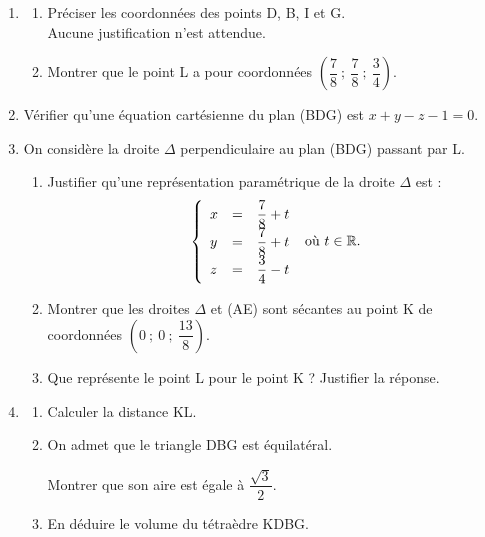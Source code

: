 \documentclass[10pt]{article}
\providecommand{\R}{\mathbb{R}}
\begin{document}
\begin{enumerate}
\item
	\begin{enumerate}
		\item Préciser les coordonnées des points D, B, I et G. \\
		Aucune justification n'est attendue.
		\item Montrer que le point L a pour coordonnées $\left(\dfrac78~;~\dfrac78~;~\dfrac34\right)$.
	\end{enumerate}
\item Vérifier qu'une équation cartésienne du plan (BDG) est $x + y - z - 1 = 0$.
\item On considère la droite $\Delta$ perpendiculaire au plan (BDG) passant par L.
	\begin{enumerate}
		\item Justifier qu'une représentation paramétrique de la droite $\Delta$ est : 
\renewcommand\arraystretch{1.9}
\[
\left\{\begin{array}{l c l}x&=&\dfrac78 + t \\ y &=& \dfrac78+t \\ z&=&\dfrac34 -t \end{array}\right. \text{ où } t \in \R. \]
\renewcommand\arraystretch{1}
		\item Montrer que les droites $\Delta$ et (AE) sont sécantes au point K de coordonnées $\left(0~;~0~;~\dfrac{13}{8}\right)$.
		\item Que représente le point L pour le point K ? Justifier la réponse.
	\end{enumerate}
\item 
	\begin{enumerate}
		\item Calculer la distance KL.
		\item On admet que le triangle DBG est équilatéral. 
		
		Montrer que son aire est égale à $\dfrac{\sqrt{3}}{2}$.

		\item En déduire le volume du tétraèdre KDBG.

	\end{enumerate}
	

\end{enumerate}
\end{document}
